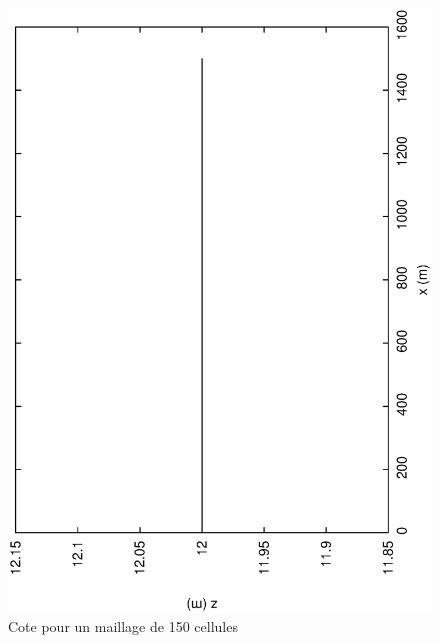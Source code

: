\documentclass[a4paper,10pt]{article}
\begin{document}
\begin{figure}
 \begin{center}
  \includegraphics[angle=270,width=15cm]{Z10.eps}
  \caption{Cote pour un maillage de 150 cellules}
  \label{fig4}
 \end{center}
\end{figure}

\newpage
\end{document}
